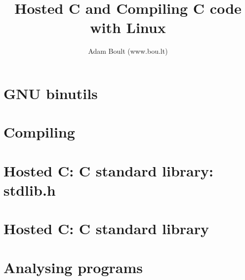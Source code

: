 \documentclass[oneside]{book}
\begin{document}
\author{Adam Boult (www.bou.lt)}
\title{Hosted C and Compiling C code with Linux}
\maketitle

\setcounter{tocdepth}{0}
\tableofcontents



\part{GNU binutils}


\part{Compiling}





\part{Hosted C: C standard library: stdlib.h}






\part{Hosted C: C standard library}













\part{Analysing programs}


\end{document}
